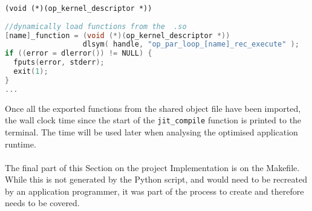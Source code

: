 \verb|(void (*)(op_kernel_descriptor *))|
\vspace{1em}
\begin{lstlisting}[backgroundcolor=\color{red!20}, language=C]
//dynamically load functions from the  .so
[name]_function = (void (*)(op_kernel_descriptor *))
                  dlsym( handle, "op_par_loop_[name]_rec_execute" );
if ((error = dlerror()) != NULL) {
  fputs(error, stderr);
  exit(1);
}
...
\end{lstlisting}
\par
\noindent Once all the exported functions from the shared object file have been imported, the wall clock time since the start of the \verb|jit_compile| function is printed to the terminal. The time will be used later when analysing the optimised application runtime.\\
\\
The final part of this Section on the project Implementation is on the Makefile. While this is not generated by the Python script, and would need to be recreated by an application programmer, it was part of the process to create and therefore needs to be covered.

